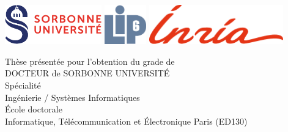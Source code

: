 %

\newcommand{\jurymember}[5]{\hspace{1.5em}\textbf{{#1} \textsc{{#2}}}, {#3}, {#4} \hfill \textit{{#5}}\\}

\begin{titlepage}
	\begin{flushleft}
      \includegraphics[height=1.7cm]{figures/sorbonne.pdf}
      \hfill
      \includegraphics[height=1.7cm]{figures/LogoLIP6.pdf}
      \hfill
      \includegraphics[height=1.7cm]{figures/inria.pdf}
	\end{flushleft}
	\vfill
	\begin{center}
        \vspace{1em}
        {\large Thèse présentée pour l'obtention du grade de}\\
        \vspace{1em}
        {\LARGE DOCTEUR de SORBONNE UNIVERSITÉ}\\
        \vspace{2em}
		{\small Spécialité}\\
		\vspace{0.5em}
		{\Large Ingénierie / Systèmes Informatiques}\\
		\vspace{2em}
        {\large École doctorale}\\
		\vspace{0.5em}
		{\Large Informatique, Télécommunication et Électronique Paris (ED130)}\\
    \end{center}
	\vfill
	\begin{flushright}
	\hfill
	\vfill
	{\LARGE\thesisTitle \par}

\end{flushright}
\end{titlepage}
